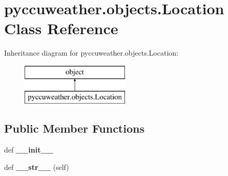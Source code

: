 \hypertarget{classpyccuweather_1_1objects_1_1_location}{}\section{pyccuweather.\+objects.\+Location Class Reference}
\label{classpyccuweather_1_1objects_1_1_location}
Inheritance diagram for pyccuweather.\+objects.\+Location\+:\begin{figure}[H]
\begin{center}
\leavevmode
\includegraphics[height=2.000000cm]{classpyccuweather_1_1objects_1_1_location}
\end{center}
\end{figure}
\subsection*{Public Member Functions}
\begin{DoxyCompactItemize}
\item 
\hypertarget{classpyccuweather_1_1objects_1_1_location_aa3a11864142d6d0ed0e0648de21a4bf6}{}def {\bfseries \+\_\+\+\_\+init\+\_\+\+\_\+}\label{classpyccuweather_1_1objects_1_1_location_aa3a11864142d6d0ed0e0648de21a4bf6}

\item 
\hypertarget{classpyccuweather_1_1objects_1_1_location_abd73ef019b1c5216b5df298dee0ac9ad}{}def {\bfseries \+\_\+\+\_\+str\+\_\+\+\_\+} (self)\label{classpyccuweather_1_1objects_1_1_location_abd73ef019b1c5216b5df298dee0ac9ad}

\end{DoxyCompactItemize}
